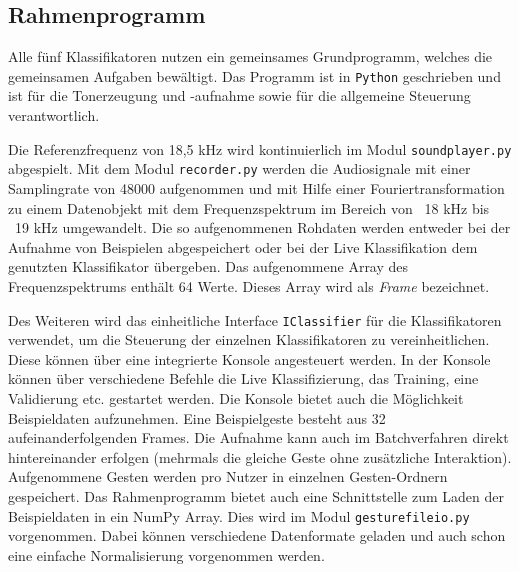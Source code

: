 \subsection{Rahmenprogramm}
\label{sec:app}
Alle fünf Klassifikatoren nutzen ein gemeinsames Grundprogramm, welches die
gemeinsamen Aufgaben bewältigt. Das Programm ist in \texttt{Python} geschrieben
und ist für die Tonerzeugung und -aufnahme sowie für die allgemeine Steuerung
verantwortlich. 

Die Referenzfrequenz von 18,5 kHz wird kontinuierlich im Modul
\texttt{soundplayer.py} abgespielt. Mit dem Modul \texttt{recorder.py} werden
die Audiosignale mit einer Samplingrate von 48000 aufgenommen und mit Hilfe einer
Fouriertransformation zu einem Datenobjekt mit dem Frequenzspektrum im Bereich
von ~18 kHz bis ~19 kHz umgewandelt. Die so aufgenommenen Rohdaten werden
entweder bei der Aufnahme von Beispielen abgespeichert oder bei der Live
Klassifikation dem genutzten Klassifikator übergeben. Das aufgenommene Array des
Frequenzspektrums enthält 64 Werte. Dieses Array wird als \textit{Frame}
bezeichnet.

Des Weiteren wird das einheitliche Interface \texttt{IClassifier} für die Klassifikatoren verwendet,
um die Steuerung der einzelnen Klassifikatoren zu vereinheitlichen. Diese können
über eine integrierte Konsole angesteuert werden. In der Konsole können über
verschiedene Befehle die Live Klassifizierung, das Training, eine Validierung
etc. gestartet werden.  
\enlargethispage{\baselineskip}
Die Konsole bietet auch die Möglichkeit Beispieldaten aufzunehmen. Eine
Beispielgeste besteht aus 32 aufeinanderfolgenden Frames. Die Aufnahme kann
auch im Batchverfahren direkt hintereinander erfolgen (mehrmals die gleiche
Geste ohne zusätzliche Interaktion). Aufgenommene Gesten werden pro Nutzer in
einzelnen Gesten-Ordnern gespeichert. Das Rahmenprogramm bietet auch eine
Schnittstelle zum Laden der Beispieldaten in ein NumPy Array. Dies wird im Modul
\texttt{gesturefileio.py} vorgenommen. Dabei können verschiedene Datenformate
geladen und auch schon eine einfache Normalisierung vorgenommen werden.



